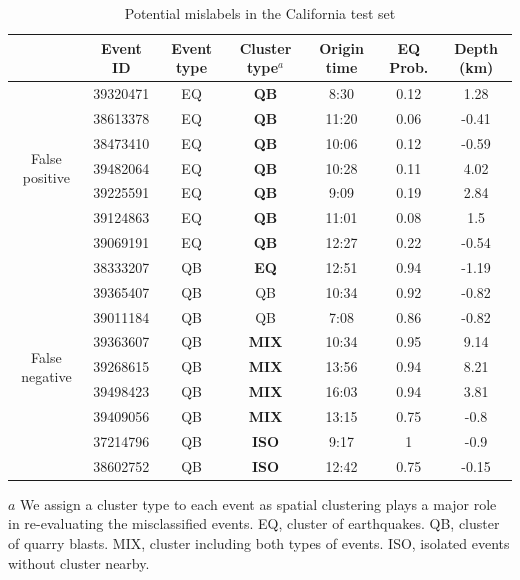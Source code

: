 \documentclass[12pt]{article}
\begin{document}
\begin{table}
  \centering
  \begin{threeparttable}[b]
  \caption{Potential mislabels in the California test set}
    \begin{tabular}{ccccccc}
    \toprule
          & Event ID & Event type & Cluster type$^a$ & Origin time & EQ Prob. & Depth (km) \\
    \midrule
    \multirow{7}[2]{*}{False positive} & 39320471 & EQ    & \textbf{QB} & 8:30  & 0.12  & 1.28 \\
          & 38613378 & EQ    & \textbf{QB} & 11:20 & 0.06  & -0.41 \\
          & 38473410 & EQ    & \textbf{QB} & 10:06 & 0.12  & -0.59 \\
          & 39482064 & EQ    & \textbf{QB} & 10:28 & 0.11  & 4.02 \\
          & 39225591 & EQ    & \textbf{QB} & 9:09  & 0.19  & 2.84 \\
          & 39124863 & EQ    & \textbf{QB} & 11:01 & 0.08  & 1.5 \\
          & 39069191 & EQ    & \textbf{QB} & 12:27 & 0.22  & -0.54 \\
    \midrule
    \multirow{9}[2]{*}{False negative} & 38333207 & QB    & \textbf{EQ} & 12:51 & 0.94  & -1.19 \\
          & 39365407 & QB    & QB    & 10:34 & 0.92  & -0.82 \\
          & 39011184 & QB    & QB    & 7:08  & 0.86  & -0.82 \\
          & 39363607 & QB    & \textbf{MIX} & 10:34 & 0.95  & 9.14 \\
          & 39268615 & QB    & \textbf{MIX} & 13:56 & 0.94  & 8.21 \\
          & 39498423 & QB    & \textbf{MIX} & 16:03 & 0.94  & 3.81 \\
          & 39409056 & QB    & \textbf{MIX} & 13:15 & 0.75  & -0.8 \\
          & 37214796 & QB    & \textbf{ISO} & 9:17  & 1     & -0.9 \\
          & 38602752 & QB    & \textbf{ISO} & 12:42 & 0.75  & -0.15 \\
    \bottomrule
    \end{tabular}%
  \label{mislabel}
    \begin{tablenotes}
        \item[$a$] We assign a cluster type to each event as spatial clustering plays a major role in re-evaluating the misclassified events. EQ, cluster of earthquakes. QB, cluster of quarry blasts. MIX, cluster including both types of events. ISO, isolated events without cluster nearby.
    \end{tablenotes}
    \end{threeparttable}
\end{table}%
\end{document}
